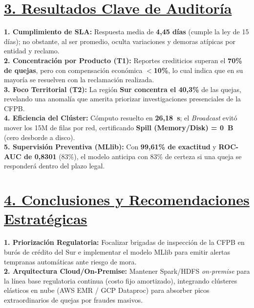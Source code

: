\documentclass[12pt,letterpaper]{article}
\begin{document}
\section*{\underline{3. Resultados Clave de Auditoría}}
\textbf{1. Cumplimiento de SLA:} Respuesta media de \textbf{4,45 días} (cumple la ley de 15 días); no obstante, al ser promedio, oculta variaciones y demoras atípicas por entidad y reclamo. \\
\textbf{2. Concentración por Producto (T1):} Reportes crediticios superan el \textbf{70\% de quejas}, pero con compensación económica \textbf{$<$10\%}, lo cual indica que en su mayoría se resuelven con la reclamación realizada. \\
\textbf{3. Foco Territorial (T2):} La región \textbf{Sur concentra el 40,3\%} de las quejas, revelando una anomalía que amerita priorizar investigaciones presenciales de la CFPB. \\
\textbf{4. Eficiencia del Clúster:} Cómputo resuelto en \textbf{26,18~s}; el \textit{Broadcast} evitó mover los 15M de filas por red, certificando \textbf{Spill (Memory/Disk) = 0~B} (cero desborde a disco). \\
\textbf{5. Supervisión Preventiva (MLlib):} Con \textbf{99,61\% de exactitud} y \textbf{ROC-AUC de 0,8301} (83\%), el modelo anticipa con 83\% de certeza si una queja se responderá dentro del plazo legal.

\section*{\underline{4. Conclusiones y Recomendaciones Estratégicas}}
\textbf{1. Priorización Regulatoria:} Focalizar brigadas de inspección de la CFPB en burós de crédito del Sur e implementar el modelo MLlib para emitir alertas tempranas automáticas ante riesgo de mora. \\
\textbf{2. Arquitectura Cloud/On-Premise:} Mantener Spark/HDFS \textit{on-premise} para la línea base regulatoria continua (costo fijo amortizado), integrando clústeres elásticos en nube (AWS EMR / GCP Dataproc) para absorber picos extraordinarios de quejas por fraudes masivos.
\end{document}
